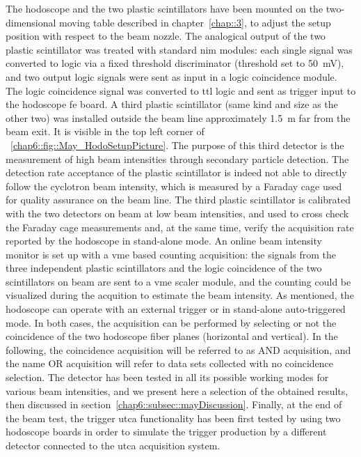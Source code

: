 The hodoscope and the two plastic scintillators have been mounted on the two-dimensional moving table described in chapter~\ref{chap::3}, to adjust the setup position with respect to the beam nozzle. 
The analogical output of the two plastic scintillator was treated with standard \gls{nim} modules: each single signal was converted to logic via a fixed threshold discriminator (threshold set to 50~mV), and two output logic signals were sent as input in a logic coincidence module. The logic coincidence signal was converted to \gls{ttl} logic and sent as trigger input to the hodoscope \gls{fe} board. 
A third plastic scintillator (same kind and size as the other two) was installed outside the beam line approximately 1.5~m far from the beam exit. It is visible in the top left corner of \figurename~\ref{chap6::fig::May_HodoSetupPicture}. The purpose of this third detector is the measurement of high beam intensities through secondary particle detection. The detection rate acceptance of the plastic scintillator is indeed not able to directly follow the cyclotron beam intensity, which is measured by a Faraday cage used for quality assurance on the beam line. The third plastic scintillator is calibrated with the two detectors on beam at low beam intensities, and used to cross check the Faraday cage measurements and, at the same time, verify the acquisition rate reported by the hodoscope in stand-alone mode. 
An online beam intensity monitor is set up with a \gls{vme} based counting acquisition: the signals from the three independent plastic scintillators and the logic coincidence of the two scintillators on beam are sent to a \gls{vme} scaler module, and the counting could be visualized during the acquition to estimate the beam intensity.
As mentioned, the hodoscope can operate with an external trigger or in stand-alone auto-triggered mode. In both cases, the acquisition can be performed by selecting or not the coincidence of the two hodoscope fiber planes (horizontal and vertical). In the following, the coincidence acquisition will be referred to as AND acquisition, and the name OR acquisition will refer to data sets collected with no coincidence selection.  
The detector has been tested in all its possible working modes for various beam intensities, and we present here a selection of the obtained results, then discussed in section~\ref{chap6::subsec::mayDiscussion}.
Finally, at the end of the beam test, the trigger \gls{utca} functionality has been first tested by using two hodoscope boards in order to simulate the trigger production by a different detector connected to the \gls{utca} acquisition system.

